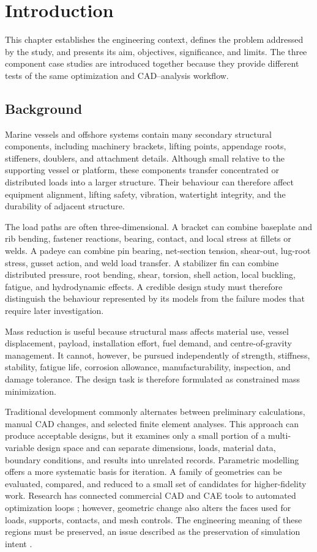\chapter{Introduction}
\label{chap:introduction}

This chapter establishes the engineering context, defines the problem addressed
by the study, and presents its aim, objectives, significance, and limits. The
three component case studies are introduced together because they provide
different tests of the same optimization and CAD--analysis workflow.

\section{Background}
\label{sec:background}

Marine vessels and offshore systems contain many secondary structural
components, including machinery brackets, lifting points, appendage roots,
stiffeners, doublers, and attachment details. Although small relative to the
supporting vessel or platform, these components transfer concentrated or
distributed loads into a larger structure. Their behaviour can therefore
affect equipment alignment, lifting safety, vibration, watertight integrity,
and the durability of adjacent structure.

The load paths are often three-dimensional. A bracket can combine baseplate
and rib bending, fastener reactions, bearing, contact, and local stress at
fillets or welds. A padeye can combine pin bearing, net-section tension,
shear-out, lug-root stress, gusset action, and weld load transfer. A stabilizer
fin can combine distributed pressure, root bending, shear, torsion, shell
action, local buckling, fatigue, and hydrodynamic effects. A credible design
study must therefore distinguish the behaviour represented by its models from
the failure modes that require later investigation.

Mass reduction is useful because structural mass affects material use, vessel
displacement, payload, installation effort, fuel demand, and
centre-of-gravity management. It cannot, however, be pursued independently of
strength, stiffness, stability, fatigue life, corrosion allowance,
manufacturability, inspection, and damage tolerance. The design task is
therefore formulated as constrained mass minimization.

Traditional development commonly alternates between preliminary calculations,
manual CAD changes, and selected finite element analyses. This approach can
produce acceptable designs, but it examines only a small portion of a
multi-variable design space and can separate dimensions, loads, material data,
boundary conditions, and results into unrelated records. Parametric modelling
offers a more systematic basis for iteration. A family of geometries can be
evaluated, compared, and reduced to a small set of candidates for
higher-fidelity work. Research has connected commercial CAD and CAE tools to
automated optimization loops \cite{park2010}; however, geometric change also
alters the faces used for loads, supports, contacts, and mesh controls. The
engineering meaning of these regions must be preserved, an issue described as
the preservation of simulation intent \cite{nolan2015}.

